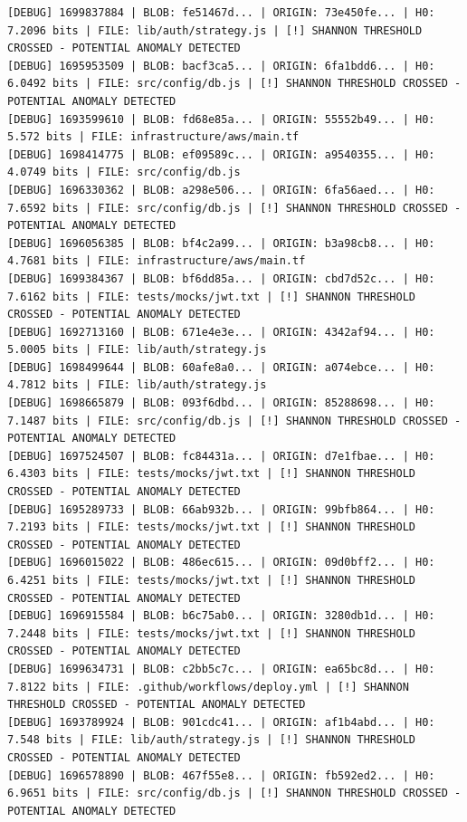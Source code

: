 \documentclass[12pt, a4paper, oneside]{report}
\begin{document}
\begin{lstlisting}[basicstyle=\tiny\ttfamily]
[DEBUG] 1699837884 | BLOB: fe51467d... | ORIGIN: 73e450fe... | H0: 7.2096 bits | FILE: lib/auth/strategy.js | [!] SHANNON THRESHOLD CROSSED - POTENTIAL ANOMALY DETECTED
[DEBUG] 1695953509 | BLOB: bacf3ca5... | ORIGIN: 6fa1bdd6... | H0: 6.0492 bits | FILE: src/config/db.js | [!] SHANNON THRESHOLD CROSSED - POTENTIAL ANOMALY DETECTED
[DEBUG] 1693599610 | BLOB: fd68e85a... | ORIGIN: 55552b49... | H0: 5.572 bits | FILE: infrastructure/aws/main.tf
[DEBUG] 1698414775 | BLOB: ef09589c... | ORIGIN: a9540355... | H0: 4.0749 bits | FILE: src/config/db.js
[DEBUG] 1696330362 | BLOB: a298e506... | ORIGIN: 6fa56aed... | H0: 7.6592 bits | FILE: src/config/db.js | [!] SHANNON THRESHOLD CROSSED - POTENTIAL ANOMALY DETECTED
[DEBUG] 1696056385 | BLOB: bf4c2a99... | ORIGIN: b3a98cb8... | H0: 4.7681 bits | FILE: infrastructure/aws/main.tf
[DEBUG] 1699384367 | BLOB: bf6dd85a... | ORIGIN: cbd7d52c... | H0: 7.6162 bits | FILE: tests/mocks/jwt.txt | [!] SHANNON THRESHOLD CROSSED - POTENTIAL ANOMALY DETECTED
[DEBUG] 1692713160 | BLOB: 671e4e3e... | ORIGIN: 4342af94... | H0: 5.0005 bits | FILE: lib/auth/strategy.js
[DEBUG] 1698499644 | BLOB: 60afe8a0... | ORIGIN: a074ebce... | H0: 4.7812 bits | FILE: lib/auth/strategy.js
[DEBUG] 1698665879 | BLOB: 093f6dbd... | ORIGIN: 85288698... | H0: 7.1487 bits | FILE: src/config/db.js | [!] SHANNON THRESHOLD CROSSED - POTENTIAL ANOMALY DETECTED
[DEBUG] 1697524507 | BLOB: fc84431a... | ORIGIN: d7e1fbae... | H0: 6.4303 bits | FILE: tests/mocks/jwt.txt | [!] SHANNON THRESHOLD CROSSED - POTENTIAL ANOMALY DETECTED
[DEBUG] 1695289733 | BLOB: 66ab932b... | ORIGIN: 99bfb864... | H0: 7.2193 bits | FILE: tests/mocks/jwt.txt | [!] SHANNON THRESHOLD CROSSED - POTENTIAL ANOMALY DETECTED
[DEBUG] 1696015022 | BLOB: 486ec615... | ORIGIN: 09d0bff2... | H0: 6.4251 bits | FILE: tests/mocks/jwt.txt | [!] SHANNON THRESHOLD CROSSED - POTENTIAL ANOMALY DETECTED
[DEBUG] 1696915584 | BLOB: b6c75ab0... | ORIGIN: 3280db1d... | H0: 7.2448 bits | FILE: tests/mocks/jwt.txt | [!] SHANNON THRESHOLD CROSSED - POTENTIAL ANOMALY DETECTED
[DEBUG] 1699634731 | BLOB: c2bb5c7c... | ORIGIN: ea65bc8d... | H0: 7.8122 bits | FILE: .github/workflows/deploy.yml | [!] SHANNON THRESHOLD CROSSED - POTENTIAL ANOMALY DETECTED
[DEBUG] 1693789924 | BLOB: 901cdc41... | ORIGIN: af1b4abd... | H0: 7.548 bits | FILE: lib/auth/strategy.js | [!] SHANNON THRESHOLD CROSSED - POTENTIAL ANOMALY DETECTED
[DEBUG] 1696578890 | BLOB: 467f55e8... | ORIGIN: fb592ed2... | H0: 6.9651 bits | FILE: src/config/db.js | [!] SHANNON THRESHOLD CROSSED - POTENTIAL ANOMALY DETECTED

\end{lstlisting}
\end{document}
